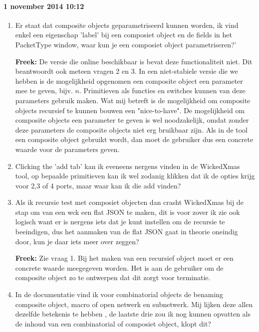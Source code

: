 \paragraph{1 november 2014 10:12}

\begin{enumerate}
\item Er staat dat composite objects geparametriseerd kunnen worden, ik vind enkel een eigenschap 'label' bij een composiet object en de fields in het PacketType window, waar kun je een composiet object parametriseren?'

\textbf{Freek:} De versie die online beschikbaar is bevat deze functionaliteit niet. Dit beantwoordt ook meteen vragen 2 en 3. In een niet-stabiele versie die we hebben is de mogelijkheid opgenomen een composite object een parameter mee te geven, bijv. $n$. Primitieven als functies en switches kunnen van deze parameters gebruik maken. Wat mij betreft is de mogelijkheid om composite objects recursief te kunnen bouwen een "nice-to-have". De mogelijkheid om composite objects een parameter te geven is wel noodzakelijk, omdat zonder deze parameters de composite objects niet erg bruikbaar zijn. Als in de tool een composite object gebruikt wordt, dan moet de gebruiker dus een concrete waarde voor de parameters geven.


\item Clicking the 'add tab' kan ik eveneens nergens vinden in de WickedXmas tool, op bepaalde primitieven kan ik wel zodanig klikken dat ik de opties krijg voor 2,3 of 4 ports, maar waar kan ik die add vinden?

\item Als ik recursie test met composiet objecten dan crasht WickedXmas bij de stap om van een wck een flat JSON te maken, dit is voor zover ik zie ook logisch want er is nergens iets dat je kunt instellen om de recursie te beeindigen, dus het aanmaken van de flat JSON gaat in theorie oneindig door, kun je daar iets meer over zeggen?

\textbf{Freek:} Zie vraag 1. Bij het maken van een recursief object moet er een concrete waarde meegegeven worden. Het is aan de gebruiker om de composite object zo te ontwerpen dat dit zorgt voor terminatie.

\item In de documentatie vind ik voor combinatorial objects de benaming composite object,  macro of open netwerk en subnetwerk. Mij lijken deze allen dezelfde betekenis te hebben , de laatste drie zou ik nog kunnen opvatten als de inhoud van een combinatorial of composiet object, klopt dit?


\end{enumerate}
